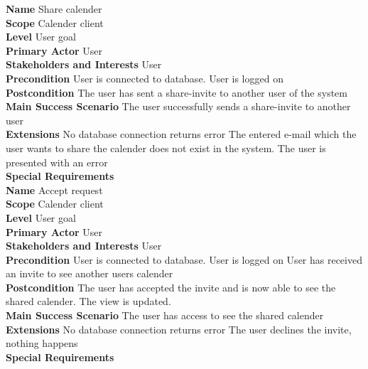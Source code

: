 \documentclass[a4paper,10pt,titlepage]{article}
\begin{document}
	\textbf{Name}
	Share calender
	\\
	\textbf{Scope}
	Calender client
	\\
	\textbf{Level}
	User goal
	\\
	\textbf{Primary Actor}
	User
	\\
	\textbf{Stakeholders and Interests}
	User
	\\
	\textbf{Precondition}
	User is connected to database.
	User is logged on
	\\
	\textbf{Postcondition}
	The user has sent a share-invite to another user of the system
	\\
	\textbf{Main Success Scenario}
	The user successfully sends a share-invite to another user
	\\
	\textbf{Extensions}
	No database connection returns error
	The entered e-mail which the user wants to share the calender does not exist in the system. The user is presented with an error
	\\
	\textbf{Special Requirements}
	\\
	
	\textbf{Name}
	Accept request
	\\
	\textbf{Scope}
	Calender client
	\\
	\textbf{Level}
	User goal
	\\
	\textbf{Primary Actor}
	User
	\\
	\textbf{Stakeholders and Interests}
	User
	\\
	\textbf{Precondition}
	User is connected to database.
	User is logged on
	User has received an invite to see another users calender
	\\
	\textbf{Postcondition}
	The user has accepted the invite and is now able to see the shared calender. The view is updated.
	\\
	\textbf{Main Success Scenario}
	The user has access to see the shared calender
	\\
	\textbf{Extensions}
	No database connection returns error
	The user declines the invite, nothing happens
	\\
	\textbf{Special Requirements}
	
\end{document}
